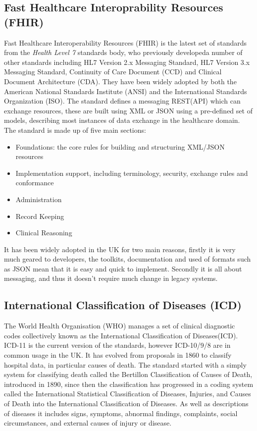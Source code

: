 \documentclass[runningheads]{llncs}
\begin{document}
	\subsection{Fast Healthcare Interoprability Resources (FHIR)}
    Fast Healthcare Interoperability Resources (FHIR) is the latest set of standards from the \emph{Health Level 7} standards body, who previously developeda number of other standards including HL7 Version 2.x Messaging Standard, HL7 Version 3.x Messaging Standard, Continuity of Care Document (CCD) and Clinical Document Architecture (CDA). They have been widely adopted by both the American National Standards Institute (ANSI) and the International Standards Organization (ISO). The standard defines a messaging REST(API) which can exchange resources, these are built using XML or JSON using a pre-defined set of models, describing most instances of data exchange in the healthcare domain.
    The standard is made up of five main sections:
    \begin{itemize}
    	\item Foundations: the core rules for building and structuring XML/JSON resources
    	\item Implementation support, including terminology, security, exchange rules and conformance
    	\item Administration
    	\item Record Keeping
    	\item Clinical Reasoning
    \end{itemize}
It has been widely adopted in the UK for two main reasons, firstly it is very much geared to developers, the toolkits, documentation and used of formats such as JSON mean that it is easy and quick to implement. Secondly it is all about messaging, and thus it doesn't require much change in legacy systems.
		
	\subsection{International Classification of Diseases (ICD)}
	
	The World Health Organisation (WHO) manages a set of clinical diagnostic codes collectively known as the International Classification of Diseases(ICD). ICD-11 is the current version of the standards, however ICD-10/9/8 are in common usage in the UK. It has evolved from proposals in 1860 to classify hospital data, in particular causes of death. The standard started with a simply system for classifying death called the Bertillon Classification of Causes of Death, introduced in 1890, since then the classification has progressed in a coding system called the International Statistical Classification of Diseases, Injuries, and Causes of Death into the International Classification of Diseases. As well as descriptions of diseases it includes signs, symptoms, abnormal findings, complaints, social circumstances, and external causes of injury or disease.  
	
\end{document}
